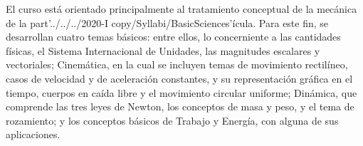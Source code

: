 \begin{syllabus}


\begin{justification}
El curso está orientado principalmente al tratamiento conceptual de la mecánica de la part'../../../2020-I copy/Syllabi/BasicSciences'ícula. Para este fin, se desarrollan cuatro temas básicos: entre ellos, lo concerniente a las cantidades físicas, el Sistema Internacional de Unidades, las magnitudes escalares y vectoriales; Cinemática, en la cual se incluyen temas de movimiento rectilíneo, casos de velocidad y de aceleración constantes, y su representación gráfica en el tiempo, cuerpos en caída libre y el movimiento circular uniforme; Dinámica, que comprende las tres leyes de Newton, los conceptos de masa y peso, y el tema de rozamiento; y los conceptos básicos de Trabajo y Energía, con alguna de sus aplicaciones.
\end{justification}


\end{syllabus}
